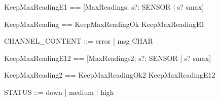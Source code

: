 \begin{zed}
[SENSOR]
\end{zed}



\begin{zed}
KeepMaxReadingE1 == [\Xi MaxReadings; s?: SENSOR | s? \notin \dom smax]
\end{zed}

\begin{zed}
KeepMaxReading == KeepMaxReadingOk \lor KeepMaxReadingE1 
\end{zed}


\begin{zed}
[CHAR] \also
CHANNEL_CONTENT ::= error | msg \ldata \seq CHAR \rdata
\end{zed}



\begin{zed}
KeepMaxReadingE12 == [\Xi MaxReadings2; s?: SENSOR | s? \notin \dom smax]
\end{zed}

\begin{zed}
KeepMaxReading2 == KeepMaxReadingOk2 \lor KeepMaxReadingE12 
\end{zed}


\begin{zed}
STATUS ::= down | medium | high
\end{zed}

